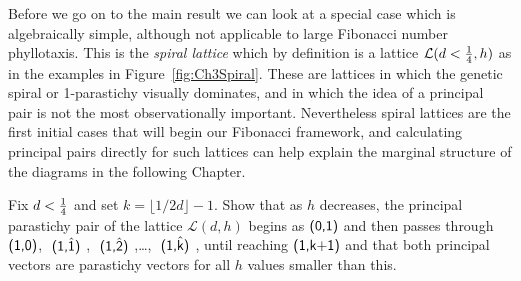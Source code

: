 Before we go on to the main result we can look at a special case which is algebraically simple, although not applicable to large Fibonacci number phyllotaxis. This is the \emph{spiral lattice} which by definition is a lattice $\mathcal{L}(d<\textstyle{\frac{1}{4}},h)$ as in the examples in Figure~\ref{fig:Ch3Spiral}. These are lattices in which
the genetic spiral or 1-parastichy visually dominates, and in which the idea of a principal pair is not the most observationally important. 
%
Nevertheless spiral lattices are the first initial cases that will begin
our Fibonacci framework, and calculating principal pairs directly for such lattices can help explain the marginal structure of the diagrams in the following Chapter.
\begin{jExercise}
	Fix  $d<\textstyle{\frac{1}{4}}$ and set  $k=\lfloor1/2d\rfloor-1$.
	Show that as $h$ decreases, the principal parastichy pair of the lattice $\mathcal{L}(d,h)$ begins as 
	 $\textsf{(0,1)}$ and then passes through $\textsf{(1,0)}$,  $\textsf{ (\ensuremath{\textsf{1}},\ensuremath{\hat{\textsf{1}}}) }$,
	  $\textsf{ (\ensuremath{\textsf{1}},\ensuremath{\hat{\textsf{2}}}) }$,\ldots ,  $\textsf{ (\ensuremath{\textsf{1}},\ensuremath{\hat{\textsf{k}}}) }$, until reaching $\textsf{(1,k+1)}$ and that  both principal vectors are parastichy vectors for all $h$ values smaller than this. 
	 
\end{jExercise} 
